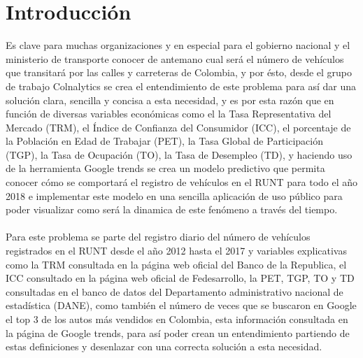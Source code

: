 \documentclass[11pt,twoside]{article}
\begin{document}
\section{Introducción}
\noindent
Es clave para muchas organizaciones y en especial para el gobierno nacional y el ministerio de transporte conocer de antemano cual será el número de vehículos que transitará por las calles y carreteras de Colombia, y por ésto, desde el grupo de trabajo Colnalytics se crea el entendimiento de este problema para así dar una solución clara, sencilla y concisa a esta necesidad, y es por esta razón que en función de diversas variables económicas como el la Tasa Representativa del Mercado (TRM), el Índice de Confianza del Consumidor (ICC), el porcentaje de la Población en Edad de Trabajar (PET), la Tasa Global de Participación (TGP), la Tasa de Ocupación (TO), la Tasa de Desempleo (TD), y haciendo uso de la herramienta Google trends se crea un modelo predictivo que permita conocer cómo se comportará el registro de vehículos en el RUNT para todo el año 2018 e implementar este modelo en una sencilla aplicación de uso público para poder visualizar como será la dinamica de este fenómeno a través del tiempo.
\\
\\
Para este problema se parte del registro diario del número de vehículos registrados en el RUNT desde el año 2012 hasta el 2017 y variables explicativas como la TRM consultada en la página web oficial del Banco de la Republica, el ICC consultado en la página web oficial de Fedesarrollo, la PET, TGP, TO y TD consultadas en el banco de datos del Departamento administrativo nacional de estadística (DANE), como también el número de veces que se buscaron en Google el top 3 de los autos más vendidos en Colombia, esta información consultada en la página de Google trends, para así poder crean un entendimiento partiendo de estas definiciones y desenlazar con una correcta solución a esta necesidad. 






\end{document}

